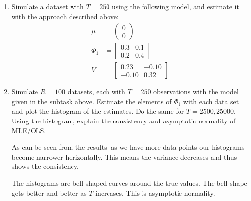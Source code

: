 \begin{enumerate}
    \item Simulate a dataset with $T=250$ using the following model, and estimate it with the approach described above:
          \begin{align*}
              \mu    & = \begin{pmatrix} 0 \\ 0 \end{pmatrix}
              \\
              \Phi_1 & = \begin{bmatrix}
                             0.3 & 0.1 \\
                             0.2 & 0.4
                         \end{bmatrix}
              \\
              V      & = \begin{bmatrix}
                             0.23  & -0.10 \\
                             -0.10 & 0.32
                         \end{bmatrix}
          \end{align*}

          \begin{sol}
              
          \end{sol}

    \item Simulate $R = 100$ datasets, each with $T = 250$ observations with the model given in the subtask above. Estimate the elements of $\Phi_1$ with each data set and plot the histogram of the estimates. Do the same for $T = 2500, 25000$. Using the histogram, explain the consistency and asymptotic normality of MLE/OLS.

          \begin{sol}
              

              As can be seen from the results, as we have more data points our histograms become narrower horizontally. This means the variance decreases and thus shows the consistency.

              The histograms are bell-shaped curves around the true values. The bell-shape gets better and better as $T$ increases. This is asymptotic normality.
          \end{sol}
\end{enumerate}